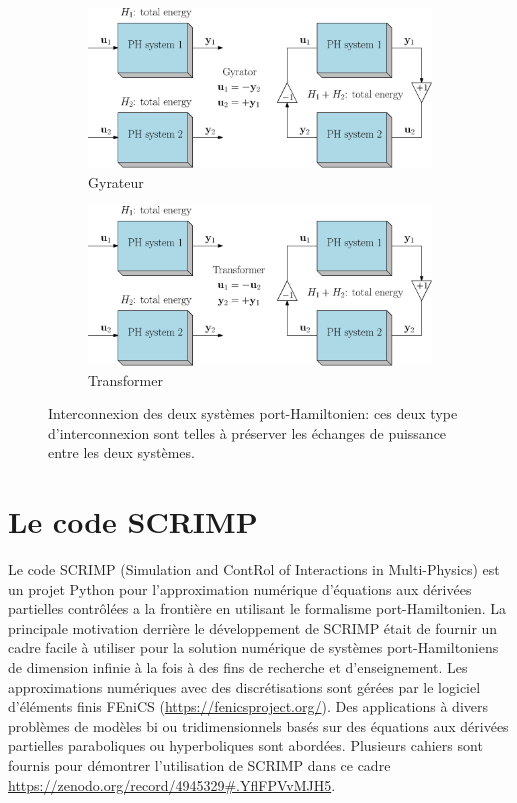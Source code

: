 \documentclass[12pt, french]{article}
\begin{document}
	\begin{figure}[t]
	\begin{subfigure}[t]{0.45\textwidth}
		\includegraphics[width=\columnwidth]{sketch_PH_gyrator.eps} 
		\caption{Gyrateur}
		\label{fig:pHsys_gyr}
	\end{subfigure}\hfill
	\begin{subfigure}[t]{0.45\textwidth}
		\includegraphics[width=\columnwidth]{sketch_PH_transformer.eps}%
		\caption{Transformer}
		\label{fig:pHsys_tran}
	\end{subfigure}
	\caption[]{Interconnexion des deux systèmes port-Hamiltonien: ces deux type d'interconnexion sont telles \`a préserver les échanges de puissance entre les deux systèmes.}%
	\label{fig:intPH}%
\end{figure}


\section{Le code SCRIMP}\label{sec:SCRIMP}
Le code SCRIMP (Simulation and ContRol of Interactions in Multi-Physics) est un projet Python pour l'approximation numérique d'équations aux dérivées partielles contrôlées a la frontière en utilisant le formalisme port-Hamiltonien. La principale motivation derrière le développement de SCRIMP était de fournir un cadre facile à utiliser pour la solution numérique de systèmes port-Hamiltoniens de dimension infinie à la fois à des fins de recherche et d'enseignement. Les approximations numériques avec des discrétisations sont gérées par le logiciel d'éléments finis FEniCS (\url{https://fenicsproject.org/}). Des applications à divers problèmes de modèles bi ou tridimensionnels basés sur des équations aux dérivées partielles paraboliques ou hyperboliques sont abordées. Plusieurs cahiers sont fournis pour démontrer l'utilisation de SCRIMP dans ce cadre \url{https://zenodo.org/record/4945329\#.YflFPVvMJH5}.
	
	
	
	
	
\end{document}
